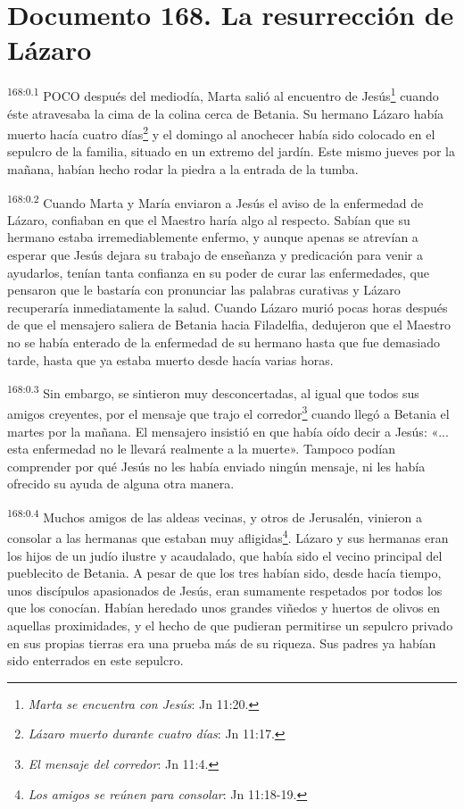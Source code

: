 \chapter{Documento 168. La resurrección de Lázaro}
\par 
\textsuperscript{168:0.1} POCO después del mediodía, Marta salió al encuentro de Jesús\footnote{\textit{Marta se encuentra con Jesús}: Jn 11:20.} cuando éste atravesaba la cima de la colina cerca de Betania. Su hermano Lázaro había muerto hacía cuatro días\footnote{\textit{Lázaro muerto durante cuatro días}: Jn 11:17.} y el domingo al anochecer había sido colocado en el sepulcro de la familia, situado en un extremo del jardín. Este mismo jueves por la mañana, habían hecho rodar la piedra a la entrada de la tumba.

\par 
\textsuperscript{168:0.2} Cuando Marta y María enviaron a Jesús el aviso de la enfermedad de Lázaro, confiaban en que el Maestro haría algo al respecto. Sabían que su hermano estaba irremediablemente enfermo, y aunque apenas se atrevían a esperar que Jesús dejara su trabajo de enseñanza y predicación para venir a ayudarlos, tenían tanta confianza en su poder de curar las enfermedades, que pensaron que le bastaría con pronunciar las palabras curativas y Lázaro recuperaría inmediatamente la salud. Cuando Lázaro murió pocas horas después de que el mensajero saliera de Betania hacia Filadelfia, dedujeron que el Maestro no se había enterado de la enfermedad de su hermano hasta que fue demasiado tarde, hasta que ya estaba muerto desde hacía varias horas.

\par 
\textsuperscript{168:0.3} Sin embargo, se sintieron muy desconcertadas, al igual que todos sus amigos creyentes, por el mensaje que trajo el corredor\footnote{\textit{El mensaje del corredor}: Jn 11:4.} cuando llegó a Betania el martes por la mañana. El mensajero insistió en que había oído decir a Jesús: «... esta enfermedad no le llevará realmente a la muerte». Tampoco podían comprender por qué Jesús no les había enviado ningún mensaje, ni les había ofrecido su ayuda de alguna otra manera.

\par 
\textsuperscript{168:0.4} Muchos amigos de las aldeas vecinas, y otros de Jerusalén, vinieron a consolar a las hermanas que estaban muy afligidas\footnote{\textit{Los amigos se reúnen para consolar}: Jn 11:18-19.}. Lázaro y sus hermanas eran los hijos de un judío ilustre y acaudalado, que había sido el vecino principal del pueblecito de Betania. A pesar de que los tres habían sido, desde hacía tiempo, unos discípulos apasionados de Jesús, eran sumamente respetados por todos los que los conocían. Habían heredado unos grandes viñedos y huertos de olivos en aquellas proximidades, y el hecho de que pudieran permitirse un sepulcro privado en sus propias tierras era una prueba más de su riqueza. Sus padres ya habían sido enterrados en este sepulcro.

